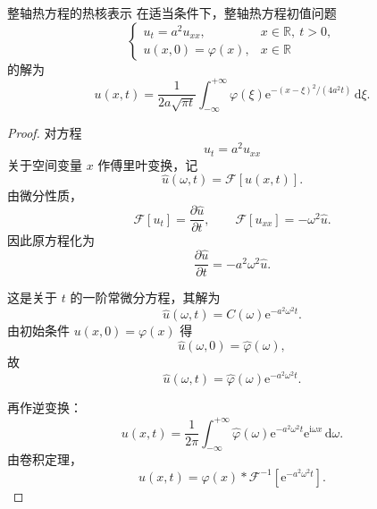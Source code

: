 \begin{dingli}{整轴热方程的热核表示}{}
在适当条件下，整轴热方程初值问题
\begin{equation}
    \begin{cases}
        u_t=a^2u_{xx}, & x\in\mathbb{R},\ t>0, \\
        u(x,0)=\varphi(x), & x\in\mathbb{R}
    \end{cases}
\end{equation}
的解为
\begin{equation}
    u(x,t)
    =
    \frac{1}{2a\sqrt{\pi t}}
    \int_{-\infty}^{+\infty}
    \varphi(\xi)\mathrm{e}^{-(x-\xi)^2/(4a^2t)}\,\mathrm{d}\xi.
\end{equation}
\end{dingli}

\begin{proof}
对方程
\begin{equation}
    u_t=a^2u_{xx}
\end{equation}
关于空间变量 $x$ 作傅里叶变换，记
\begin{equation}
    \hat{u}(\omega,t)=\mathcal{F}[u(x,t)].
\end{equation}
由微分性质，
\begin{equation}
    \mathcal{F}[u_t]=\frac{\partial \hat{u}}{\partial t},
    \qquad
    \mathcal{F}[u_{xx}]=-\omega^2\hat{u}.
\end{equation}
因此原方程化为
\begin{equation}
    \frac{\partial \hat{u}}{\partial t}=-a^2\omega^2\hat{u}.
\end{equation}

这是关于 $t$ 的一阶常微分方程，其解为
\begin{equation}
    \hat{u}(\omega,t)=C(\omega)\mathrm{e}^{-a^2\omega^2 t}.
\end{equation}
由初始条件 $u(x,0)=\varphi(x)$ 得
\begin{equation}
    \hat{u}(\omega,0)=\hat{\varphi}(\omega),
\end{equation}
故
\begin{equation}
    \hat{u}(\omega,t)=\hat{\varphi}(\omega)\mathrm{e}^{-a^2\omega^2 t}.
\end{equation}

再作逆变换：
\begin{equation}
    u(x,t)=\frac{1}{2\pi}\int_{-\infty}^{+\infty}
    \hat{\varphi}(\omega)\mathrm{e}^{-a^2\omega^2 t}\mathrm{e}^{\mathrm{i}\omega x}\,\mathrm{d}\omega.
\end{equation}
由卷积定理，
\begin{equation}
    u(x,t)=\varphi(x)*\mathcal{F}^{-1}\!\left[\mathrm{e}^{-a^2\omega^2 t}\right].
\end{equation}


\end{proof}
